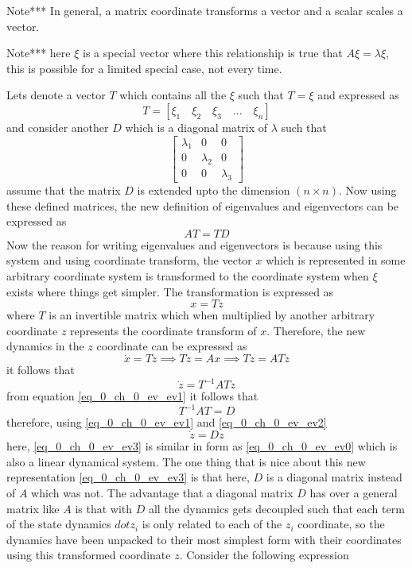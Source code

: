 Note*** In general, a matrix coordinate transforms a vector and a scalar scales a vector.

Note*** here $\xi$ is a special vector where this relationship is true that $A \xi = \lambda \xi$, this is possible for a limited special case, not every time.

Lets denote a vector $T$ which contains all the $\xi$ such that $T = \xi$ and expressed as
$$T = [\xi_1 \quad \xi_2 \quad \xi_3 \quad ... \quad \xi_n]$$ and consider another $D$ which is a diagonal matrix of $\lambda$ such that
$$\begin{bmatrix}
\lambda_{1} & 0 & 0 \\ 0 & \lambda_{2} & 0 \\ 0 & 0 & \lambda_{3}
\end{bmatrix}$$
assume that the matrix $D$ is extended upto the dimension $(n\times n)$. Now using these defined matrices, the new definition of eigenvalues and eigenvectors can be expressed as
\begin{equation}\label{eq_0_ch_0_ev_ev1}
	AT = TD
\end{equation}
Now the reason for writing eigenvalues and eigenvectors is because using this system and using coordinate transform, the vector $x$ which is represented in some arbitrary coordinate system is transformed to the coordinate system when $\xi$ exists where things get simpler. The transformation is expressed as
$$x = Tz$$ where $T$ is an invertible matrix which when multiplied by another arbitrary coordinate $z$ represents the coordinate transform of $x$. Therefore, the new dynamics in the $z$ coordinate can be expressed as
\begin{equation}
	\dot{x} = T\dot{z} \implies T\dot{z} = Ax \implies  T\dot{z} = ATz
\end{equation}
it follows that
\begin{equation}\label{eq_0_ch_0_ev_ev2}
	\dot{z} = T^{-1}ATz
\end{equation}
from equation \eqref{eq_0_ch_0_ev_ev1} it follows that
\begin{equation}
	T^{-1}AT = D
\end{equation}
therefore, using \eqref{eq_0_ch_0_ev_ev1} and \eqref{eq_0_ch_0_ev_ev2}
\begin{equation}\label{eq_0_ch_0_ev_ev3}
	\dot{z} = Dz
\end{equation}
here, \eqref{eq_0_ch_0_ev_ev3} is similar in form as \eqref{eq_0_ch_0_ev_ev0} which is also a linear dynamical system. The one thing that is nice about this new representation \eqref{eq_0_ch_0_ev_ev3} is that here, $D$ is a diagonal matrix instead of $A$ which was not. The advantage that a diagonal matrix $D$ has over a general matrix like $A$ is that with $D$ all the dynamics gets decoupled such that each term of the state dynamics $dot{z}_{i}$ is only related to each of the $z_{i}$ coordinate, so the dynamics have been unpacked to their most simplest form with their coordinates using this transformed coordinate $z$. Consider the following expression
